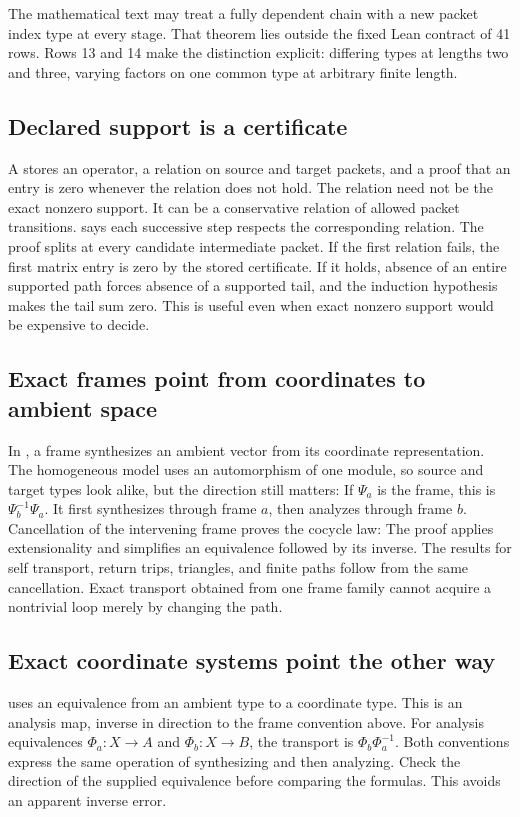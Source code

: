 The mathematical text may treat a fully dependent chain with a new packet index type at every stage. That theorem lies outside the fixed Lean contract of 41 rows. Rows 13 and 14 make the distinction explicit: differing types at lengths two and three, varying factors on one common type at arbitrary finite length.

\subsection{Declared support is a certificate}
A  stores an operator, a relation on source and target packets, and a proof that an entry is zero whenever the relation does not hold. The relation need not be the exact nonzero support. It can be a conservative relation of allowed packet transitions.  says each successive step respects the corresponding relation.
The proof splits at every candidate intermediate packet. If the first relation fails, the first matrix entry is zero by the stored certificate. If it holds, absence of an entire supported path forces absence of a supported tail, and the induction hypothesis makes the tail sum zero. This is useful even when exact nonzero support would be expensive to decide.

\subsection{Exact frames point from coordinates to ambient space}
In , a frame synthesizes an ambient vector from its coordinate representation. The homogeneous model uses an automorphism of one module, so source and target types look alike, but the direction still matters:
If $\Psi_a$ is the frame, this is $\Psi_b^{-1}\Psi_a$. It first synthesizes through frame $a$, then analyzes through frame $b$. Cancellation of the intervening frame proves the cocycle law:
The proof applies extensionality and simplifies an equivalence followed by its inverse. The results for self transport, return trips, triangles, and finite paths follow from the same cancellation. Exact transport obtained from one frame family cannot acquire a nontrivial loop merely by changing the path.

\subsection{Exact coordinate systems point the other way}
 uses an equivalence  from an ambient type to a coordinate type. This is an analysis map, inverse in direction to the frame convention above.
For analysis equivalences $\Phi_a:X\to A$ and $\Phi_b:X\to B$, the transport is $\Phi_b\Phi_a^{-1}$. Both conventions express the same operation of synthesizing and then analyzing. Check the direction of the supplied equivalence before comparing the formulas. This avoids an apparent inverse error.

